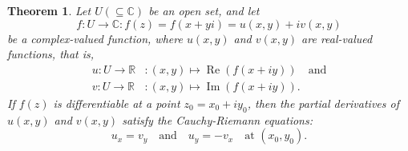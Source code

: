 \documentclass[12pt,openany]{book}
\newtheorem{theorem}{Theorem}[chapter]
\theoremstyle{definition}
\newcommand{\R}{\mathbb{R}}
\newcommand{\C}{\mathbb{C}}
\newcommand{\of}[1]{\left( #1 \right)}
\renewcommand{\Re}{\operatorname{Re}}
\renewcommand{\Im}{\operatorname{Im}}
\begin{document}
	
	\begin{tcolorbox}[colframe=thmcolor, title={\color{white}\bf Cauchy-Riemann Equations}]
		\begin{theorem}
			Let $U\of{\subseteq\C}$ be an open set, and let \[f:U\to\C:f(z) =f\of{x+yi} = u(x, y) + iv(x, y)
			\] be a complex-valued function, where $u(x, y)$ and $v(x, y)$ are real-valued functions, that is, \begin{align*}
				u:U\to\R&:(x,y)\mapsto \Re\of{f(x+iy)}\quad\text{and}\\ v:U\to\R&:\of{x,y}\mapsto\Im\of{f(x+iy)}.
			\end{align*} If $f(z)$ is differentiable at a point $z_0 = x_0 + iy_0$, then the partial derivatives of $u(x, y)$ and $v(x, y)$ satisfy the Cauchy-Riemann equations: 
			\[
			u_x=v_y\quad\text{and}\quad u_y=-v_x\quad\text{at $(x_0,y_0)$}.
			\]
		\end{theorem}
	\end{tcolorbox}
	
\end{document}
